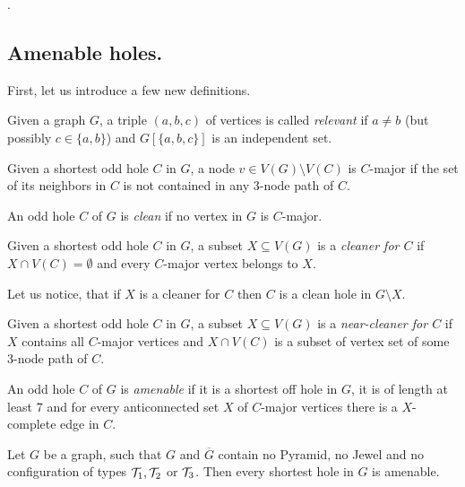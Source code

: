 .

\subsection{Amenable holes.}
\label{AmenableHoles}

First, let us introduce a few new definitions.

\begin{defn}
	Given a graph $G$, a triple $(a, b, c)$ of vertices is called \emph{relevant} if $a \neq b$ (but possibly $c \in \{a, b\}$) and $G[\{a,b,c\}]$ is an independent set.
\end{defn}

\begin{defn}
  Given a shortest odd hole $C$ in $G$, a node $v \in V(G) \setminus V(C)$ is $C$-major if the set of its neighbors in $C$ is not contained in any 3-node path of $C$.
\end{defn}

\begin{defn}
  An odd hole $C$ of $G$ is \emph{clean} if no vertex in $G$ is $C$-major.
\end{defn}

\begin{defn}[cleaner]
  Given a shortest odd hole $C$ in $G$, a subset $X \subseteq V(G)$ is a \emph{cleaner for $C$} if $X \cap V(C) = \emptyset$ and every $C$-major vertex belongs to $X$.
\end{defn}

Let us notice, that if $X$ is a cleaner for $C$ then $C$ is a clean hole in $G \setminus X$.

\begin{defn}
  Given a shortest odd hole $C$ in $G$, a subset $X \subseteq V(G)$ is a \emph{near-cleaner for $C$} if $X$ contains all $C$-major vertices and $X \cap V(C)$ is a subset of vertex set of some 3-node path of $C$.
\end{defn}

\begin{defn}
  An odd hole $C$ of $G$ is \emph{amenable} if it is a shortest off hole in $G$, it is of length at least 7 and for every anticonnected set $X$ of $C$-major vertices there is a $X$-complete edge in $C$.
\end{defn}

\begin{theorem}
	\label{thm:amenableHoles}
	Let $G$ be a graph, such that $G$ and $\overline{G}$ contain no Pyramid, no Jewel and no configuration of types $\mathcal{T}_1, \mathcal{T}_2$ or $\mathcal{T}_3$. Then every shortest hole in $G$ is amenable.
\end{theorem}

